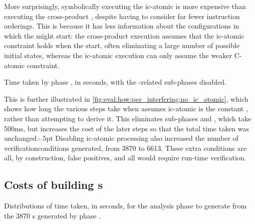 More surprisingly, symbolically executing the \gls{ic-atomic}
{\StateMachine} is more expensive than executing the cross-product
{\StateMachine}, despite having to consider far fewer instruction
orderings.  This is because it has less information about the
configurations in which the {\StateMachines} might start: the
cross-product execution assumes that the \gls{ic-atomic} constraint
holds when the {\StateMachines} start, often eliminating a large
number of possible initial states, whereas the \gls{ic-atomic}
execution can only assume the weaker C-atomic constraint.

\begin{sanefig}
  \caption{Time taken by phase \subinterfering{}, in seconds, with the
    -related sub-phases disabled.}
  \label{fig:eval:how:per_interfering:no_ic_atomic}
\end{sanefig}

This is further illustrated in
\autoref{fig:eval:how:per_interfering:no_ic_atomic}, which shows how
long the various steps take when {\implementation} assumes
\gls{ic-atomic} is the constant \true, rather than attempting to
derive it.  This eliminates sub-phases  and
, which take 500ms, but increases the cost of the
later steps so that the total time taken was
unchanged.\kern-.5pt
Disabling \gls{ic-atomic} processing also increased the number of
\glspl{verificationcondition} generated, from 3870 to 6613.  These
extra conditions are all, by construction, false positives, and all
would require run-time verification.

\subsection{Costs of building s}

\begin{sanefig}
  \caption{Distributions of time taken, in seconds, for the \subenf{}
    analysis phase to generate  from the
    3870 s generated by phase
    \subinterfering{}.}
  \label{fig:eval:how:build_enforcer}
\end{sanefig}

